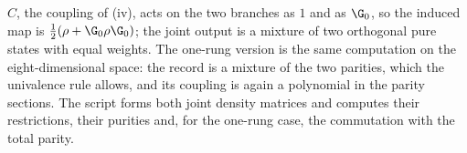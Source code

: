 $C$, the coupling of (iv), acts on the two branches as $1$ and as $\G_{0}$, so the induced map is $\tfrac12(\rho + \G_{0}\rho\G_{0})$; the joint output is a mixture of two orthogonal pure states with equal weights. The one-rung version is the same computation on the eight-dimensional space: the record is a mixture of the two parities, which the univalence rule allows, and its coupling is again a polynomial in the parity sections. The script forms both joint density matrices and computes their restrictions, their purities and, for the one-rung case, the commutation with the total parity.
